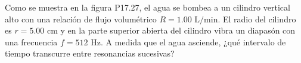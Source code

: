 \item Como se muestra en la figura P17.27, el agua se bombea a un cilindro vertical alto con una relación de flujo volumétrico $R = 1.00\text{ L/min}$. El radio del cilindro es $r = 5.00\text{ cm}$ y en la parte superior abierta del cilindro vibra un diapasón con una frecuencia $f = 512\text{ Hz}$. A medida que el agua asciende, ¿qué intervalo de tiempo transcurre entre resonancias sucesivas?